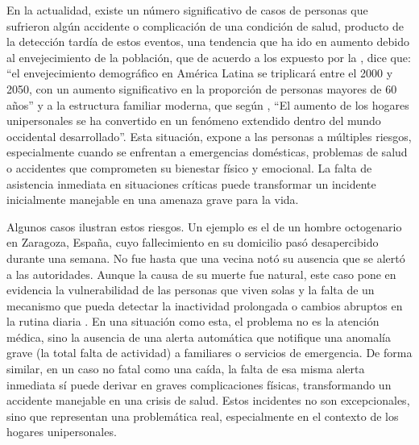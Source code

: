 
En la actualidad, existe un número significativo de casos de personas que sufrieron algún accidente o complicación de una condición de salud, producto de la detección tardía de estos eventos, una tendencia que ha ido en aumento debido al envejecimiento de la población, que de acuerdo a los expuesto por la \citeauthor{cepal_2005} \citeyear{cepal_2005}, dice que: “el envejecimiento demográfico en América Latina se triplicará entre el 2000 y 2050, con un aumento significativo en la proporción de personas mayores de 60 años” y a la estructura familiar moderna, que según \citeauthor{pena2016reciente} \citeyear{pena2016reciente}, ``El aumento de los hogares unipersonales se ha convertido en un fenómeno extendido dentro del mundo occidental desarrollado''. Esta situación, expone a las personas a múltiples riesgos, especialmente cuando se enfrentan a emergencias domésticas, problemas de salud o accidentes que comprometen su bienestar físico y emocional. La falta de asistencia inmediata en situaciones críticas puede transformar un incidente inicialmente manejable en una amenaza grave para la vida.

Algunos casos ilustran estos riesgos. Un ejemplo es el de un hombre octogenario en Zaragoza, España, cuyo fallecimiento en su domicilio pasó desapercibido durante una semana. No fue hasta que una vecina notó su ausencia que se alertó a las autoridades. Aunque la causa de su muerte fue natural, este caso pone en evidencia la vulnerabilidad de las personas que viven solas y la falta de un mecanismo que pueda detectar la inactividad prolongada o cambios abruptos en la rutina diaria \cite{ralla_hallan_2024}. En una situación como esta, el problema no es la atención médica, sino la ausencia de una alerta automática que notifique una anomalía grave (la total falta de actividad) a familiares o servicios de emergencia. De forma similar, en un caso no fatal como una caída, la falta de esa misma alerta inmediata sí puede derivar en graves complicaciones físicas, transformando un accidente manejable en una crisis de salud. Estos incidentes no son excepcionales, sino que representan una problemática real, especialmente en el contexto de los hogares unipersonales.

